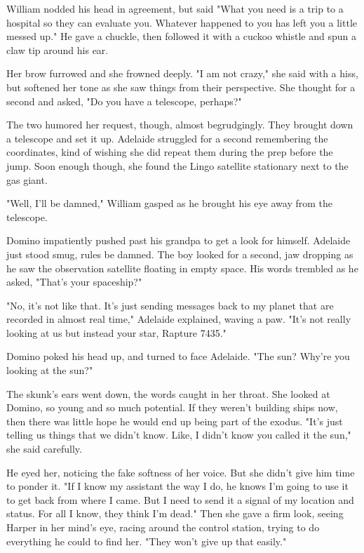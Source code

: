 William nodded his head in agreement, but said "What you need is a trip to a hospital so they can evaluate you. Whatever happened to you has left you a little messed up." He gave a chuckle, then followed it with a cuckoo whistle and spun a claw tip around his ear.

Her brow furrowed and she frowned deeply. "I am not crazy," she said with a hiss, but softened her tone as she saw things from their perspective. She thought for a second and asked, "Do you have a telescope, perhaps?"

The two humored her request, though, almost begrudgingly. They brought down a telescope and set it up. Adelaide struggled for a second remembering the coordinates, kind of wishing she did repeat them during the prep before the jump. Soon enough though, she found the Lingo satellite stationary next to the gas giant.

"Well, I'll be damned," William gasped as he brought his eye away from the telescope.

Domino impatiently pushed past his grandpa to get a look for himself. Adelaide just stood smug, rules be damned. The boy looked for a second, jaw dropping as he saw the observation satellite floating in empty space. His words trembled as he asked, "That's your spaceship?"

"No, it's not like that. It's just sending messages back to my planet that are recorded in almost real time," Adelaide explained, waving a paw. "It's not really looking at us but instead your star, Rapture 7435."

Domino poked his head up, and turned to face Adelaide. "The sun? Why're you looking at the sun?"

The skunk's ears went down, the words caught in her throat. She looked at Domino, so young and so much potential. If they weren't building ships now, then there was little hope he would end up being part of the exodus. "It's just telling us things that we didn't know. Like, I didn't know you called it the sun," she said carefully.

He eyed her, noticing the fake softness of her voice. But she didn't give him time to ponder it. "If I know my assistant the way I do, he knows I'm going to use it to get back from where I came. But I need to send it a signal of my location and status. For all I know, they think I'm dead." Then she gave a firm look, seeing Harper in her mind's eye, racing around the control station, trying to do everything he could to find her. "They won't give up that easily."

